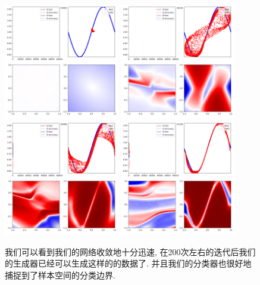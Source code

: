 \documentclass[lang=cn,11pt]{elegantpaper}
\begin{document}
\begin{figure}[hbt]
\centering
  \includegraphics[width=0.45\textwidth]{sin_2_1}
  \includegraphics[width=0.45\textwidth]{sin_2_2}\\
  \includegraphics[width=0.45\textwidth]{sin_2_3}
  \includegraphics[width=0.45\textwidth]{sin_2_4}
  \caption{我们可以看到我们的网络收敛地十分迅速, 在200次左右的迭代后我们的生成器已经可以生成这样的的数据了. 并且我们的分类器也很好地捕捉到了样本空间的分类边界.}
\end{figure}
\end{document}
